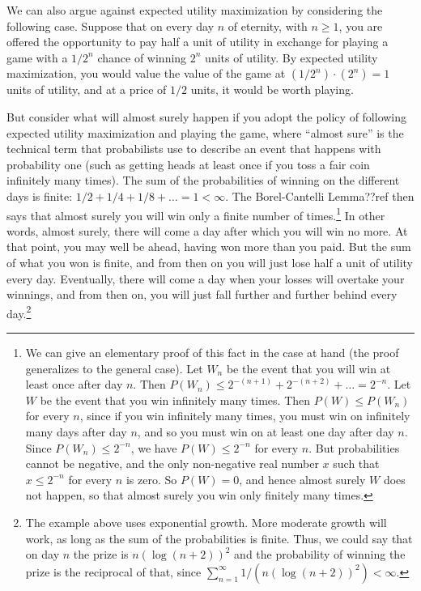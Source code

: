 We can also argue against expected utility maximization by considering the following case. Suppose that on every day $n$ of
eternity, with $n\ge 1$, you are offered the opportunity to pay half a unit of utility in exchange for playing a game with a 
$1/2^n$ chance of winning $2^n$ units of utility. By expected utility maximization, you would value the value of the game at
$(1/2^n)\cdot (2^n)=1$ units of utility, and at a price of $1/2$ units, it would be worth playing. 

But consider what will almost surely happen if you adopt the policy of following expected utility maximization and playing the game, where ``almost sure'' is 
the technical term that probabilists use to describe an event that happens with probability one (such as getting heads at least 
once if you toss a fair coin infinitely many times). The sum of the probabilities of winning on the different days is finite: 
$1/2+1/4+1/8+\dots=1<\infty$. The Borel-Cantelli Lemma??ref then says that almost surely you will win only a finite number of times.\footnote{We 
can give an elementary proof of this fact in the case at hand (the proof generalizes to the general case). Let $W_n$ be the event that you will win at least once after day $n$. 
Then $P(W_n)\le 2^{-(n+1)}+2^{-(n+2)}+\dots = 2^{-n}$. Let $W$ be the event that you win infinitely many times. Then $P(W)\le P(W_n)$ for
every $n$, since if you win infinitely many times, you must win on infinitely many days after day $n$, and so you must win on at least one
day after day $n$. Since $P(W_n) \le 2^{-n}$, we have $P(W) \le 2^{-n}$ for every $n$. But probabilities cannot be negative, and the only 
non-negative real number $x$ such that $x \le 2^{-n}$ for every $n$ is zero. So $P(W)=0$, and hence almost surely $W$ does not happen,
so that almost surely you win only finitely many times.} In other words, almost surely, there will come a day after which you will win no more. At that point, you may well be ahead,
having won more than you paid. But the sum of what you won is finite, and from then on you will just lose half a unit of utility every 
day. Eventually, there will come a day when your losses will overtake your winnings, and from then on, you will just fall further and further
behind every day.\footnote{The example above uses exponential growth. More moderate growth will work, as long as the sum of the probabilities
is finite. Thus, we could say that on day $n$ the prize is $n (\log (n+2))^2$ and the probability of winning the prize is the reciprocal
of that, since $\sum_{n=1}^\infty 1/(n (\log (n+2))^2)<\infty$.}

